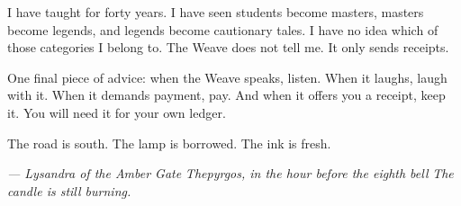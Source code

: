 \documentclass[11pt]{book}
\begin{document}
I have taught for forty years. I have seen students become masters, masters become legends, and legends become cautionary tales. I have no idea which of those categories I belong to. The Weave does not tell me. It only sends receipts.

One final piece of advice: when the Weave speaks, listen. When it laughs, laugh with it. When it demands payment, pay. And when it offers you a receipt, keep it. You will need it for your own ledger.

The road is south. The lamp is borrowed. The ink is fresh.

\textit{--- Lysandra of the Amber Gate}
\textit{Thepyrgos, in the hour before the eighth bell}
\textit{The candle is still burning.}
\end{document}
